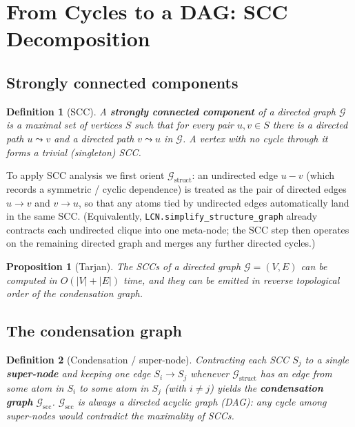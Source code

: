 \documentclass[11pt]{article}
\newtheorem{definition}{Definition}
\newtheorem{proposition}{Proposition}
\newcommand{\cG}{\mathcal{G}}
\newcommand{\scc}{\mathrm{scc}}
\begin{document}
\section{From Cycles to a DAG: SCC Decomposition}\label{sec:scc}

\subsection{Strongly connected components}

\begin{definition}[SCC]
A \textbf{strongly connected component} of a directed graph $\cG$ is a maximal
set of vertices $S$ such that for every pair $u,v\in S$ there is a directed
path $u\!\leadsto\!v$ and a directed path $v\!\leadsto\!u$ in $\cG$. A vertex
with no cycle through it forms a trivial (singleton) SCC.
\end{definition}

To apply SCC analysis we first orient $\cG_{\text{struct}}$: an undirected
edge $u\!-\!v$ (which records a symmetric / cyclic dependence) is treated as
the pair of directed edges $u\!\to\!v$ and $v\!\to\!u$, so that any atoms
tied by undirected edges automatically land in the same SCC. (Equivalently,
\texttt{LCN.simplify\_structure\_graph} already contracts each undirected
clique into one meta-node; the SCC step then operates on the remaining
directed graph and merges any further directed cycles.)

\begin{proposition}[Tarjan]
The SCCs of a directed graph $\cG=(V,E)$ can be computed in $O(|V|+|E|)$ time,
and they can be emitted in reverse topological order of the condensation graph.
\end{proposition}

\subsection{The condensation graph}

\begin{definition}[Condensation / super-node]
Contracting each SCC $S_j$ to a single \textbf{super-node} and keeping one
edge $S_i\!\to\!S_j$ whenever $\cG_{\text{struct}}$ has an edge from some atom
in $S_i$ to some atom in $S_j$ (with $i\ne j$) yields the
\textbf{condensation graph} $\cG_{\scc}$. $\cG_{\scc}$ is always a
\emph{directed acyclic graph} (DAG): any cycle among super-nodes would
contradict the maximality of SCCs.
\end{definition}
\end{document}

